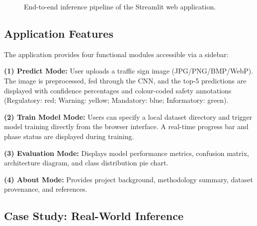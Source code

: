 \documentclass[journal,10pt,twocolumn]{IEEEtran}
\begin{document}
\begin{figure}[H]
\centering
{}
\caption{End-to-end inference pipeline of the Streamlit web application.}
\label{fig:system}
\end{figure}

\subsection{Application Features}

The application provides four functional modules accessible via a sidebar:

\textbf{(1) Predict Mode:} User uploads a traffic sign image (JPG/PNG/BMP/WebP).
The image is preprocessed, fed through the CNN, and the top-5 predictions are
displayed with confidence percentages and colour-coded safety annotations
(Regulatory: red; Warning: yellow; Mandatory: blue; Informatory: green).

\textbf{(2) Train Model Mode:} Users can specify a local dataset directory and
trigger model training directly from the browser interface. A real-time progress
bar and phase status are displayed during training.

\textbf{(3) Evaluation Mode:} Displays model performance metrics, confusion
matrix, architecture diagram, and class distribution pie chart.

\textbf{(4) About Mode:} Provides project background, methodology summary,
dataset provenance, and references.

\subsection{Case Study: Real-World Inference}
\end{document}
